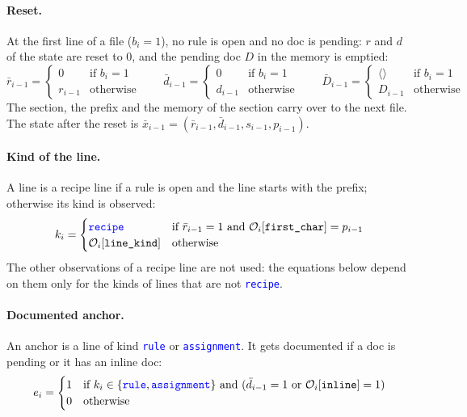 \documentclass[11pt]{article}
\newcommand{\kind}[1]{\textcolor{blue}{\texttt{#1}}}
\newcommand{\field}[1]{\texttt{#1}}
\newcommand{\Obs}[1]{\mathcal{O}_i[\field{#1}]}
\newcommand{\emptyseq}{\langle\rangle}
\begin{document}
\paragraph{Reset.} At the first line of a file ($b_i = 1$), no rule is open and no doc is
pending: $r$ and $d$ of the state are reset to 0, and the pending doc $D$ in the memory is
emptied:
\begin{equation}
  \bar r_{i-1} =
  \begin{cases}
    0 & \text{if } b_i = 1\\
    r_{i-1} & \text{otherwise}
  \end{cases}
  \qquad
  \bar d_{i-1} =
  \begin{cases}
    0 & \text{if } b_i = 1\\
    d_{i-1} & \text{otherwise}
  \end{cases}
  \qquad
  \bar D_{i-1} =
  \begin{cases}
    \emptyseq & \text{if } b_i = 1\\
    D_{i-1} & \text{otherwise}
  \end{cases}
  \label{eq:reset}
\end{equation}
The section, the prefix and the memory of the section carry over to the next file. The
state after the reset is $\bar x_{i-1} = (\bar r_{i-1}, \bar d_{i-1}, s_{i-1}, p_{i-1})$.

\paragraph{Kind of the line.} A line is a recipe line if a rule is open and the line starts
with the prefix; otherwise its kind is observed:
\begin{equation}
  k_i =
  \begin{cases}
    \kind{recipe} & \text{if } \bar r_{i-1} = 1 \text{ and } \Obs{first\_char} = p_{i-1}\\
    \Obs{line\_kind} & \text{otherwise}
  \end{cases}
  \label{eq:k}
\end{equation}
The other observations of a recipe line are not used: the equations below depend on them
only for the kinds of lines that are not \kind{recipe}.

\paragraph{Documented anchor.} An anchor is a line of kind \kind{rule} or
\kind{assignment}. It gets documented if a doc is pending or it has an inline doc:
\begin{equation}
  e_i =
  \begin{cases}
    1 & \text{if } k_i \in \{\kind{rule}, \kind{assignment}\} \text{ and }
        (\bar d_{i-1} = 1 \text{ or } \Obs{inline} = 1)\\
    0 & \text{otherwise}
  \end{cases}
  \label{eq:e}
\end{equation}
\end{document}
